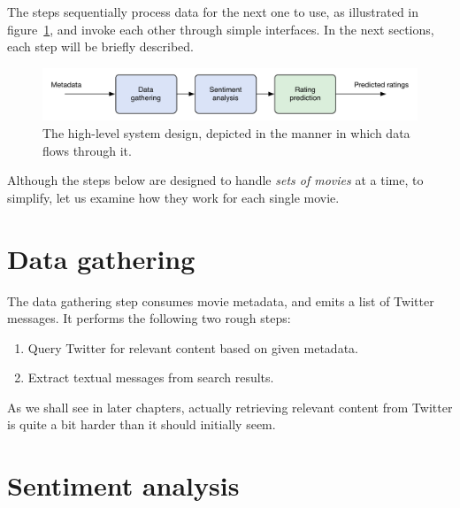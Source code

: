 The steps sequentially process data for the next one to use, as illustrated in figure~\ref{fig:dataflow_modular}, and invoke each other through simple interfaces. In the next sections, each step will be briefly described.

\begin{figure}[h]
  \centering
    \includegraphics[width=\textwidth]{Figures/dataflow-modular}
  \caption{The high-level system design, depicted in the manner in which data flows through it.}
  \label{fig:dataflow_modular}
\end{figure}


Although the steps below are designed to handle \emph{sets of movies} at a time, to simplify, let us examine how they work for each single movie.

\section{Data gathering} %
\label{sec:data_gathering_step}

The data gathering step consumes movie metadata, and emits a list of Twitter messages. It performs the following two rough steps:

\begin{enumerate}
  \item Query Twitter for relevant content based on given metadata.
  \item Extract textual messages from search results.
\end{enumerate}

As we shall see in later chapters, actually retrieving relevant content from Twitter is quite a bit harder than it should initially seem.


\section{Sentiment analysis} %
\label{sec:sentiment_analysis_step}

